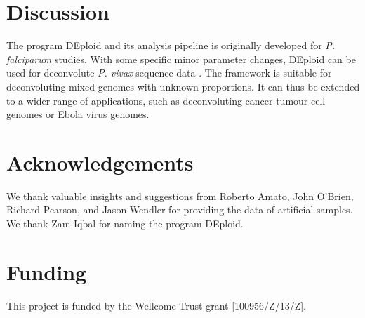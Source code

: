 \documentclass{bioinfo}
\begin{document}
\begin{methods}
\section{Performance}

\begin{figure}[h]%
\centerline{
\texttt{[image: \{switchVsMisCopyErrlog]}.png}
}
\caption{}\label{hap}
\end{figure}



\subsection{Accuracy}

\subsection{Run-time assessment}


\end{methods}


\section{Discussion}
The program DEploid and its analysis pipeline is originally developed for {\it P. falciparum} studies. With some specific minor parameter changes, DEploid can be used for deconvolute {\it P. vivax} sequence data \citep{Pearson2016}. The framework is suitable for deconvoluting mixed genomes with unknown proportions. It can thus be extended to a wider range of applications, such as deconvoluting cancer tumour cell genomes or Ebola virus genomes.



\section*{Acknowledgements}
We thank valuable insights and suggestions from Roberto Amato, John O'Brien, Richard Pearson, and Jason Wendler for providing the data of artificial samples. We thank Zam Iqbal for naming the program DEploid.

\section*{Funding}
This project is funded by the Wellcome Trust grant [100956/Z/13/Z].\\
~\\
\end{document}

